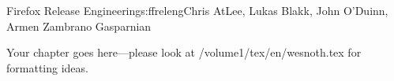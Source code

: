 \begin{aosachapter}{Firefox Release Engineering}{s:ffreleng}{Chris AtLee, Lukas Blakk, John O'Duinn, Armen Zambrano Gasparnian}

Your chapter goes here---please look at /volume1/tex/en/wesnoth.tex for 
formatting ideas.

\end{aosachapter}
